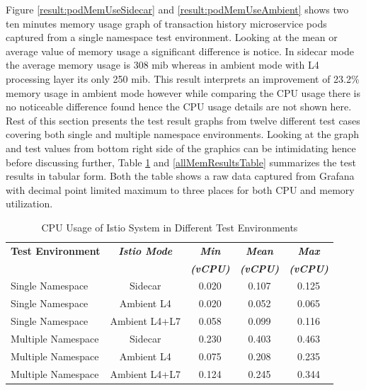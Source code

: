 Figure \ref{result:podMemUseSidecar} and \ref{result:podMemUseAmbient} shows two ten minutes memory usage graph of transaction history microservice pods captured from a single namespace test environment. Looking at the mean or average value of memory usage a significant difference is notice. In sidecar mode the average memory usage is 308 \gls{mib} whereas in ambient mode with L4 processing layer its only 250 \gls{mib}. This result interprets an improvement of 23.2\% memory usage in ambient mode however while comparing the CPU usage there is no noticeable difference found hence the CPU usage details are not shown here. Rest of this section presents the test result graphs from twelve different test cases covering both single and multiple namespace environments. Looking at the graph and test values from bottom right side of the graphics can be intimidating hence before discussing further, Table \ref{allCpuResultsTable} and \ref{allMemResultsTable} summarizes the test results in tabular form. Both the table shows a raw data captured from Grafana with decimal point limited maximum to three places for both CPU and memory utilization.

\begin{table}[ht!]
  \centering
  \begin{tabular}{ |l|c|c|c|c|}
    \hline
    \textbf{Test Environment} & \textbf{\textit{Istio Mode}} & \textbf{\textit{Min}} & \textbf{\textit{Mean}} & \textbf{\textit{Max}} \\
    \textbf{\textit{ }} & \textbf{\textit{ }} & \textbf{\textit{(vCPU)}} & \textbf{\textit{(vCPU)}} & \textbf{\textit{(vCPU)}} \\ \hline
    Single Namespace & Sidecar & 0.020 & 0.107 & 0.125 \\ \hline
    Single Namespace & Ambient L4 & 0.020 & 0.052 & 0.065 \\ \hline
    Single Namespace & Ambient L4+L7 & 0.058 & 0.099 & 0.116 \\ \hline

    Multiple Namespace & Sidecar & 0.230 & 0.403 & 0.463 \\ \hline
    Multiple Namespace & Ambient L4 & 0.075 & 0.208 & 0.235 \\ \hline
    Multiple Namespace & Ambient L4+L7 & 0.124 & 0.245 & 0.344 \\ \hline
  \end{tabular}
  \caption{CPU Usage of Istio System in Different Test Environments}
  \label{allCpuResultsTable}
\end{table}

